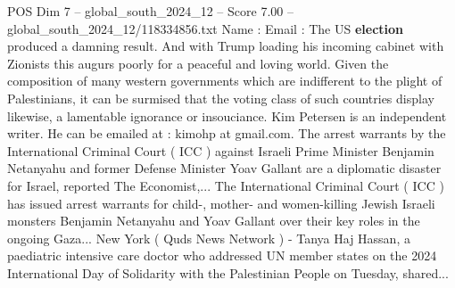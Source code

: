 \begin{textsample}{POS Dim 7 – global\_south\_2024\_12 – Score 7.00 – global\_south\_2024\_12/118334856.txt}
Name : Email : The US \textbf{election} produced a damning result.
And with Trump loading his incoming cabinet with Zionists this augurs poorly for a peaceful and loving world.
Given the composition of many western governments which are indifferent to the plight of Palestinians, it can be surmised that the voting class of such countries display likewise, a lamentable ignorance or insouciance.
Kim Petersen is an independent writer.
He can be emailed at : kimohp at gmail.com.
The arrest warrants by the International Criminal Court ( ICC ) against Israeli Prime Minister Benjamin Netanyahu and former Defense Minister Yoav Gallant are a diplomatic disaster for Israel, reported The Economist,...
The International Criminal Court ( ICC ) has issued arrest warrants for child-, mother- and women-killing Jewish Israeli monsters Benjamin Netanyahu and Yoav Gallant over their key roles in the ongoing Gaza...
New York ( Quds News Network ) - Tanya Haj Hassan, a paediatric intensive care doctor who addressed UN member states on the 2024 International Day of Solidarity with the Palestinian People on Tuesday, shared...

\end{textsample}
